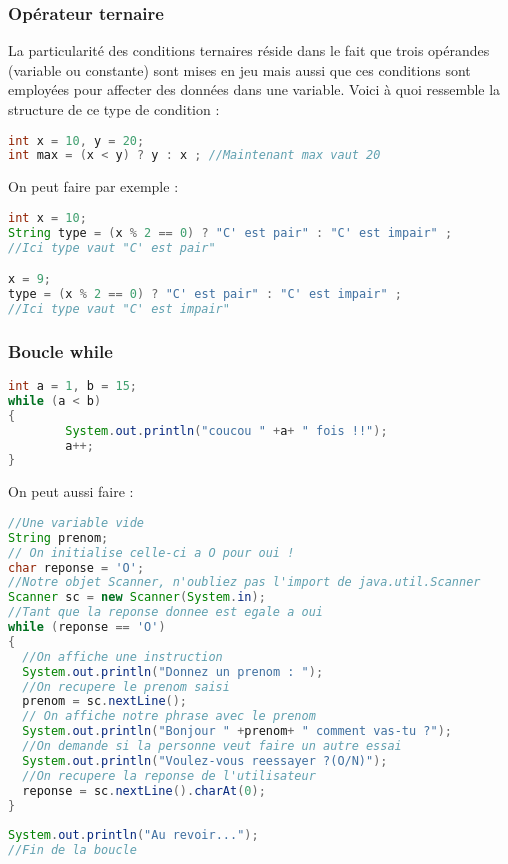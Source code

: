 \documentclass[a4paper,twoside]{article}
\begin{document}
\subsubsection{Opérateur ternaire}
La particularité des conditions ternaires réside dans le fait que trois opérandes (variable ou constante) sont mises en jeu mais aussi que ces conditions sont employées pour affecter des données dans une variable. Voici à quoi ressemble la structure de ce type de condition :
\begin{lstlisting}[language=java]
int x = 10, y = 20;
int max = (x < y) ? y : x ; //Maintenant max vaut 20
\end{lstlisting}

On peut faire par exemple : 
\begin{lstlisting}[language=java]
int x = 10;
String type = (x % 2 == 0) ? "C' est pair" : "C' est impair" ; 
//Ici type vaut "C' est pair"

x = 9;
type = (x % 2 == 0) ? "C' est pair" : "C' est impair" ; 
//Ici type vaut "C' est impair"
\end{lstlisting}

\subsubsection{Boucle while}
\begin{lstlisting}[language=java]
int a = 1, b = 15;
while (a < b)
{
        System.out.println("coucou " +a+ " fois !!");
        a++;
}
\end{lstlisting}

On peut aussi faire :
\begin{lstlisting}[language=java]
//Une variable vide
String prenom;
// On initialise celle-ci a O pour oui !
char reponse = 'O';
//Notre objet Scanner, n'oubliez pas l'import de java.util.Scanner
Scanner sc = new Scanner(System.in);
//Tant que la reponse donnee est egale a oui
while (reponse == 'O')
{
  //On affiche une instruction
  System.out.println("Donnez un prenom : ");
  //On recupere le prenom saisi
  prenom = sc.nextLine();
  // On affiche notre phrase avec le prenom
  System.out.println("Bonjour " +prenom+ " comment vas-tu ?");
  //On demande si la personne veut faire un autre essai
  System.out.println("Voulez-vous reessayer ?(O/N)");
  //On recupere la reponse de l'utilisateur
  reponse = sc.nextLine().charAt(0);
}
 
System.out.println("Au revoir...");
//Fin de la boucle
\end{lstlisting}
\end{document}
